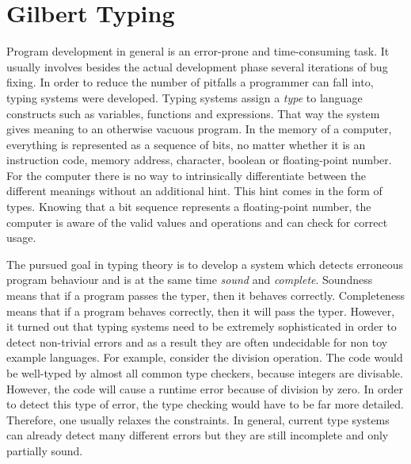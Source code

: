 \chapter{Gilbert Typing}
\label{cha:gilberttyping}

Program development in general is an error-prone and time-consuming task.
It usually involves besides the actual development phase several iterations of bug fixing.
In order to reduce the number of pitfalls a programmer can fall into, typing systems were developed.
Typing systems assign a \emph{type} to language constructs such as variables, functions and expressions.
That way the system gives meaning to an otherwise vacuous program.
In the memory of a computer, everything is represented as a sequence of bits, no matter whether it is an instruction code, memory address, character, boolean or floating-point number.
For the computer there is no way to intrinsically differentiate between the different meanings without an additional hint.
This hint comes in the form of types.
Knowing that a bit sequence represents a floating-point number, the computer is aware of the valid values and operations and can check for correct usage.

The pursued goal in typing theory is to develop a system which detects erroneous program behaviour and is at the same time \emph{sound} and \emph{complete}.
Soundness means that if a program passes the typer, then it behaves correctly.
Completeness means that if a program behaves correctly, then it will pass the typer.
However, it turned out that typing systems need to be extremely sophisticated in order to detect non-trivial errors and as a result they are often undecidable for non toy example languages.
For example, consider the division operation.
The code  would be well-typed by almost all common type checkers, because integers are divisable.
However, the code will cause a runtime error because of division by zero.
In order to detect this type of error, the type checking would have to be far more detailed.
Therefore, one usually relaxes the constraints.
In general, current type systems can already detect many different errors but they are still incomplete and only partially sound.

